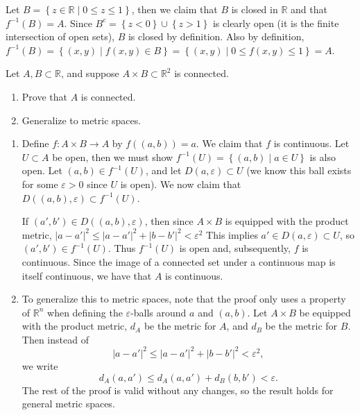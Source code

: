 \documentclass[10pt]{amsart}
\newenvironment{exercise}[1]{%
	\vspace{10mm}
	\renewcommand\themanualtheoreminner{#1}%
  \manualtheoreminner
}\hrulefill{\endmanualtheoreminner}
\begin{document}
Let $B = \left\{ z \in \mathbb{R} \;|\; 0 \leq z \leq 1 \right\}$, then we claim that $B$ is closed in $\mathbb{R}$ and that $f^{-1}(B) = A$. Since $B^c = \left\{ z < 0 \right\} \cup \left\{ z > 1 \right\}$ is clearly open (it is the finite intersection of open sets), $B$ is closed by definition. Also by definition, $f^{-1}(B)=\left\{ (x,y) \;|\; f(x,y) \in B \right\}=\left\{ (x,y) \;|\; 0 \leq f(x,y) \leq 1 \right\}=A$.

\pagebreak
\begin{exercise}{Page 184, 4.2.4}
	Let $A,B \subset \mathbb{R}$, and suppose $A \times B \subset \mathbb{R}^2$ is connected.
	\begin{enumerate}
		\item Prove that $A$ is connected.
		\item Generalize to metric spaces.
	\end{enumerate}
\end{exercise}

\begin{enumerate}
	\item Define $f:A\times B \to A$ by $f( (a,b))=a$. We claim that $f$ is continuous. Let $U \subset A$ be open, then we must show $f^{-1}(U)=\left\{ (a,b) \;|\; a \in U \right\}$ is also open. Let $(a,b) \in f^{-1}(U)$, and let $D(a,\varepsilon) \subset U$ (we know this ball exists for some $\varepsilon>0$ since $U$ is open). We now claim that $D( (a,b), \varepsilon) \subset f^{-1}(U)$.

		If $(a',b') \in D( (a,b), \varepsilon)$, then since $A\times B$ is equipped with the product metric, $|a-a'|^2\leq|a-a'|^2+|b-b'|^2 <\varepsilon^2$ This implies $a' \in D(a,\varepsilon) \subset U$, so $(a',b') \in f^{-1}(U)$. Thus $f^{-1}(U)$ is open and, subsequently, $f$ is continuous. Since the image of a connected set under a continuous map is itself continuous, we have that $A$ is continuous.

	\item To generalize this to metric spaces, note that the proof only uses a property of $\mathbb{R}^n$ when defining the $\varepsilon$-balls around $a$ and $(a,b)$. Let $A \times B$ be equipped with the product metric, $d_A$ be the metric for $A$, and $d_B$ be the metric for $B$. Then instead of
		\[
		|a-a'|^2\leq|a-a'|^2+|b-b'|^2 <\varepsilon^2,
		\] we write
		\[
			d_A(a,a') \leq d_A(a,a') + d_B(b,b') < \varepsilon.
		\] 
		The rest of the proof is valid without any changes, so the result holds for general metric spaces.
\end{enumerate}
\end{document}
